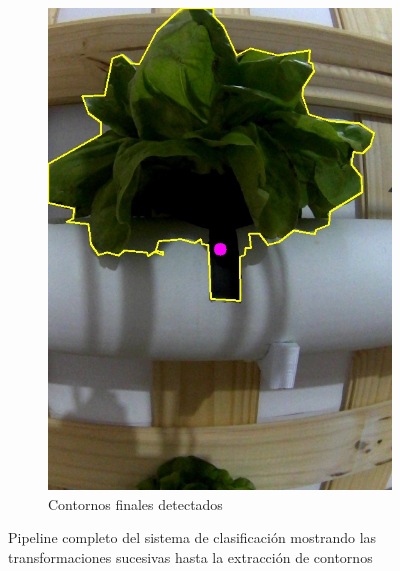 \begin{figure}[H]
\begin{subfigure}[b]{0.48\textwidth}
    \includegraphics[width=\textwidth]{imagenes/clasificador_6_contornos.jpg}
    \caption{Contornos finales detectados}
\end{subfigure}

\caption{Pipeline completo del sistema de clasificación mostrando las transformaciones sucesivas hasta la extracción de contornos}
\label{fig:pipeline_clasificacion}
\end{figure}